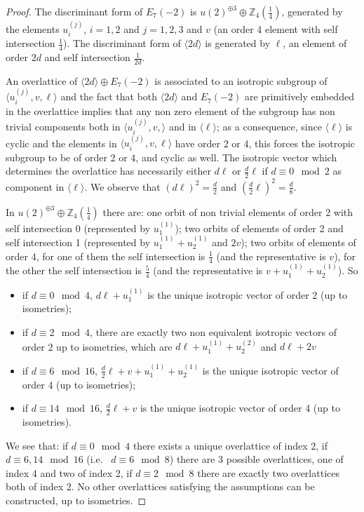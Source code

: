 \documentclass{amsart}
\theoremstyle{definition}
\numberwithin{equation}{section}
\numberwithin{equation}{section} \theoremstyle{definition}
\newcommand\Z{\mathbb{Z}}
\begin{document}
\begin{proof}
The discriminant form of $E_7(-2)$ is $u(2)^{\oplus 3}\oplus \Z_4(\frac{1}{4})$, generated by the elements $u_i^{(j)}$, $i=1,2$ and $j=1,2,3$ and $v$ (an order 4 element with self intersection $\frac{1}{4}$). The discriminant form of $\langle 2d\rangle$ is generated by $\ell$, an element of order $2d$ and self intersection $\frac{1}{2d}$.

An overlattice of $\langle 2d\rangle\oplus E_7(-2)$ is associated to an 
isotropic subgroup of $\langle u_i^{(j)},v,\ell\rangle$ and the fact that both $\langle 2d\rangle$ and $E_7(-2)$ are primitively embedded in the overlattice implies that any non zero element of the subgroup has  non trivial components both in $\langle u_i^{(j)},v,\rangle$ and in $\langle \ell\rangle$;  as a consequence, since $\langle \ell\rangle$ is cyclic and the elements in $\langle u_i^{(j)},v,\ell\rangle$ have order 2 or 4, this forces the isotropic subgroup to be of order 2 or 4, and cyclic as well. 
The isotropic vector which determines the overlattice 
has necessarily
either $d\ell$ or $\frac{d}{2}\ell$ if $d\equiv 0\mod 2$ as component in  $\langle \ell\rangle$. We observe that $(d\ell)^2=\frac{d}{2}$ and $\left(\frac{d}{2}\ell\right)^2=\frac{d}{8}$.

In $u(2)^{\oplus 3}\oplus \Z_4(\frac{1}{4})$ there are: one orbit of non trivial elements of order 2 with self intersection 0 (represented by $u_1^{(1)}$); two orbits of elements of order 2 and self intersection 1 (represented by $u_1^{(1)}+u_2^{(1)}$ and $2v$); two orbits of elements of order 4, for one of them the self intersection is $\frac{1}{4}$ (and the representative is $v$), for the other the self intersection is $\frac{5}{4}$ (and the representative is $v+u_1^{(1)}+u_2^{(1)}$). So
\begin{itemize}\item if $d\equiv 0 \mod 4$, $d\ell+u_1^{(1)}$ is the unique isotropic vector of order 2 (up to isometries);
\item if $d\equiv 2 \mod 4$, there are exactly two non equivalent isotropic vectors of order 2 up to isometries, which are $d\ell+u_1^{(1)}+u_2^{(2)}$ and $d\ell+2v$
\item if $d\equiv 6 \mod 16$, $\frac{d}{2}\ell+v+u_1^{(1)}+u_2^{(1)}$ is the unique isotropic vector of order 4 (up to isometries);
\item if $d\equiv 14 \mod 16$, $\frac{d}{2}\ell+v$ is the unique isotropic vector of order 4 (up to isometries).\end{itemize}
We see that: if $d\equiv 0\mod 4$ there exists a unique overlattice of index 2, if $d\equiv 6,14\mod 16$ (i.e.~ $d\equiv 6\mod 8$) there are 3 possible overlattices, one of index 4 and two of index 2, if $d\equiv 2 \mod 8$ there are exactly two overlattices both of index 2. No other overlattices satisfying the assumptions can be constructed, up to isometries.


\end{proof}
\end{document}

